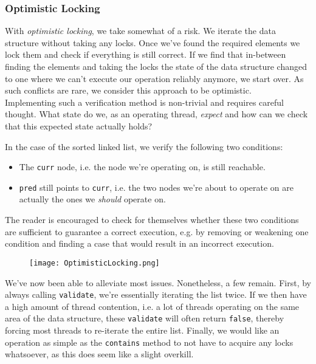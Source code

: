 \documentclass[main]{subfiles}
\begin{document}
\subsubsection{Optimistic Locking} \label{optimistic locking}
With \textit{optimistic locking}, we take somewhat of a risk. We iterate the data structure without taking any locks. Once we've found the required elements we lock them and check if everything is still correct. If we find that in-between finding the elements and taking the locks the state of the data structure changed to one where we can't execute our operation reliably anymore, we start over. As such conflicts are rare, we consider this approach to be optimistic.\\[3mm]
Implementing such a verification method is non-trivial and requires careful thought. What state do we, as an operating thread, \textit{expect} and how can we check that this expected state actually holds?
\newpage
\begin{example}
    In the case of the sorted linked list, we verify the following two conditions:
    \begin{itemize}
        \item The \texttt{curr} node, i.e. the node we're operating on, is still reachable.
        \item \texttt{pred} still points to \texttt{curr}, i.e. the two nodes we're about to operate on are actually the ones we \textit{should} operate on.
    \end{itemize}
    The reader is encouraged to check for themselves whether these two conditions are sufficient to guarantee a correct execution, e.g. by removing or weakening one condition and finding a case that would result in an incorrect execution.
    \begin{figure}[H]
        \centering
        \texttt{[image: OptimisticLocking.png]}
    \end{figure}
\end{example}
We've now been able to alleviate most issues. Nonetheless, a few remain. First, by always calling \texttt{validate}, we're essentially iterating the list twice. If we then have a high amount of thread contention, i.e. a lot of threads operating on the same area of the data structure, these \texttt{validate} will often return \texttt{false}, thereby forcing most threads to re-iterate the entire list. Finally, we would like an operation as simple as the \texttt{contains} method to not have to acquire any locks whatsoever, as this does seem like a slight overkill.
\end{document}
